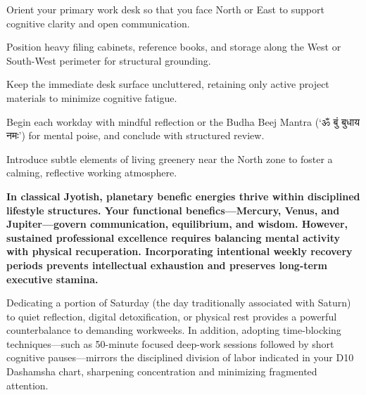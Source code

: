 \begin{diamondlist}
  \item {\fontsize{8.5}{12}\selectfont Orient your primary work desk so that you face North or East to support cognitive clarity and open communication.}
  \item {\fontsize{8.5}{12}\selectfont Position heavy filing cabinets, reference books, and storage along the West or South-West perimeter for structural grounding.}
  \item {\fontsize{8.5}{12}\selectfont Keep the immediate desk surface uncluttered, retaining only active project materials to minimize cognitive fatigue.}
  \item {\fontsize{8.5}{12}\selectfont Begin each workday with mindful reflection or the Budha Beej Mantra (‘ॐ बुं बुधाय नमः’) for mental poise, and conclude with structured review.}
  \item {\fontsize{8.5}{12}\selectfont Introduce subtle elements of living greenery near the North zone to foster a calming, reflective working atmosphere.}
\end{diamondlist}


\label{topic63}

{\fontsize{9.5}{13.8}\selectfont\bfseries\color{DeepSlate} In classical Jyotish, planetary benefic energies thrive within disciplined lifestyle structures. Your functional benefics---Mercury, Venus, and Jupiter---govern communication, equilibrium, and wisdom. However, sustained professional excellence requires balancing mental activity with physical recuperation. Incorporating intentional weekly recovery periods prevents intellectual exhaustion and preserves long-term executive stamina.}\par\vspace{2mm}

{\fontsize{9}{13}\selectfont Dedicating a portion of Saturday (the day traditionally associated with Saturn) to quiet reflection, digital detoxification, or physical rest provides a powerful counterbalance to demanding workweeks. In addition, adopting time-blocking techniques---such as 50-minute focused deep-work sessions followed by short cognitive pauses---mirrors the disciplined division of labor indicated in your D10 Dashamsha chart, sharpening concentration and minimizing fragmented attention.}\par\vspace{1.8mm}

